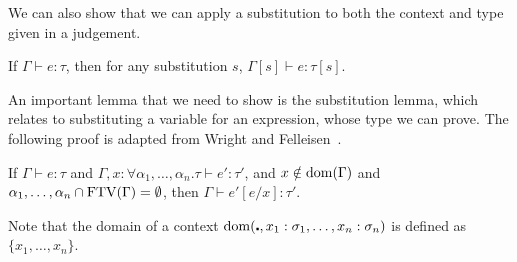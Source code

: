 We can also show that we can apply a substitution to both the context
and type given in a judgement.
\begin{lemma}\label{lem:subContextTyping}
  If $\Gamma \vdash e : \tau$, then for any substitution $s$, $\Gamma[s] \vdash e : \tau[s]$.
\end{lemma}

An important lemma that we need to show is the substitution
lemma, which relates to substituting a variable for an expression,
whose type we can prove. The following proof is adapted from Wright
and Felleisen~\cite{wright1994}.

\begin{lemma}[Substitution]\label{lem:substitution}
  If $\Gamma \vdash e : \tau$ and ${\Gamma , x : \forall \alpha_1, \ldots, \alpha_n . \tau \vdash e' : \tau'}$, and ${x \notin \operatorname{dom}(\Gamma)}$ and
  ${\alpha_1 , \ldots, \alpha_n \cap \operatorname{FTV}(\Gamma) = \emptyset}$, then ${\Gamma \vdash e' [e/x] : \tau'}$.
\end{lemma}
Note that the domain of a context $\operatorname{dom}(\centerdot , x_1 : \sigma_1 , \ldots , x_n :
\sigma_n)$ is defined as $\{ x_1 , \ldots , x_n \}$.
